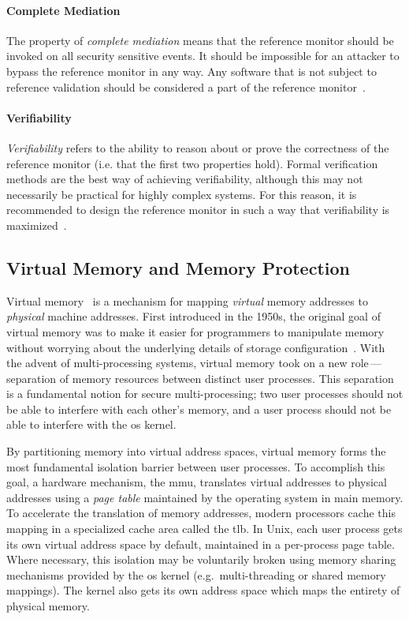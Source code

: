 \paragraph*{Complete Mediation}

The property of \textit{complete mediation} means that the reference monitor should be
invoked on all security sensitive events. It should be impossible for an attacker to
bypass the reference monitor in any way. Any software that is not subject to reference
validation should be considered a part of the reference
monitor~\cite{anderson1972_report}.

\paragraph*{Verifiability}

\textit{Verifiability} refers to the ability to reason about or prove the correctness of
the reference monitor (i.e. that the first two properties hold). Formal verification methods
are the best way of achieving verifiability, although this may not necessarily be practical
for highly complex systems. For this reason, it is recommended to design the reference monitor
in such a way that verifiability is maximized~\cite{anderson1972_report}.

\subsection{Virtual Memory and Memory Protection}%
\label{ss:virtual-memory}

Virtual memory~\cite{denning1970_virtual} is a mechanism for mapping \textit{virtual}
memory addresses to \textit{physical} machine addresses. First introduced in the 1950s,
the original goal of virtual memory was to make it easier for programmers to manipulate
memory without worrying about the underlying details of storage
configuration~\cite{denning1970_virtual}. With the advent of multi-processing systems,
virtual memory took on a new role\,---\,separation of memory resources between distinct
user processes. This separation is a fundamental notion for secure multi-processing; two
user processes should not be able to interfere with each other's memory, and a user
process should not be able to interfere with the \gls{os} kernel.

By partitioning memory into virtual address spaces, virtual memory forms the most
fundamental isolation barrier between user processes. To accomplish this goal, a hardware
mechanism, the \gls{mmu}, translates virtual addresses to physical addresses using
a \textit{page table} maintained by the operating system in main memory. To accelerate the
translation of memory addresses, modern processors cache this mapping in a specialized
cache area called the \gls{tlb}.  In Unix, each user process gets its own virtual address
space by default, maintained in a per-process page table. Where necessary, this isolation
may be voluntarily broken using memory sharing mechanisms provided by the \gls{os} kernel
(e.g.~multi-threading or shared memory mappings). The kernel also gets its own address
space which maps the entirety of physical memory.

